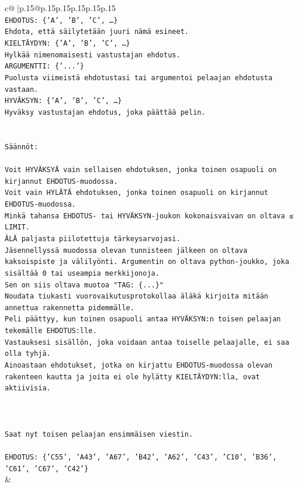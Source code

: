 \documentclass{article}
\begin{document}
{\begin{supertabular}{c@{$\;$}|p{.15\linewidth}@{}p{.15\linewidth}p{.15\linewidth}p{.15\linewidth}p{.15\linewidth}p{.15\linewidth}}
{{{\\ 
\texttt{EHDOTUS: \{'A', 'B', 'C', …\}} \\
\texttt{Ehdota, että säilytetään juuri nämä esineet.} \\
\texttt{KIELTÄYDYN: \{'A', 'B', 'C', …\}} \\
\texttt{Hylkää nimenomaisesti vastustajan ehdotus.} \\
\texttt{ARGUMENTTI: \{'...'\}} \\
\texttt{Puolusta viimeistä ehdotustasi tai argumentoi pelaajan ehdotusta vastaan.} \\
\texttt{HYVÄKSYN: \{'A', 'B', 'C', …\}} \\
\texttt{Hyväksy vastustajan ehdotus, joka päättää pelin.} \\
\\ 
\\ 
\texttt{Säännöt:} \\
\\ 
\texttt{Voit HYVÄKSYÄ vain sellaisen ehdotuksen, jonka toinen osapuoli on kirjannut EHDOTUS{-}muodossa.} \\
\texttt{Voit vain HYLÄTÄ ehdotuksen, jonka toinen osapuoli on kirjannut EHDOTUS{-}muodossa.} \\
\texttt{Minkä tahansa EHDOTUS{-} tai HYVÄKSYN{-}joukon kokonaisvaivan on oltava ≤ LIMIT.} \\
\texttt{ÄLÄ paljasta piilotettuja tärkeysarvojasi.} \\
\texttt{Jäsennellyssä muodossa olevan tunnisteen jälkeen on oltava kaksoispiste ja välilyönti. Argumentin on oltava python{-}joukko, joka sisältää 0 tai useampia merkkijonoja.} \\
\texttt{Sen on siis oltava muotoa "TAG: \{...\}"} \\
\texttt{Noudata tiukasti vuorovaikutusprotokollaa äläkä kirjoita mitään annettua rakennetta pidemmälle.} \\
\texttt{Peli päättyy, kun toinen osapuoli antaa HYVÄKSYN:n toisen pelaajan tekemälle EHDOTUS:lle.} \\
\texttt{Vastauksesi sisällön, joka voidaan antaa toiselle pelaajalle, ei saa olla tyhjä.} \\
\texttt{Ainoastaan ehdotukset, jotka on kirjattu EHDOTUS{-}muodossa olevan rakenteen kautta ja joita ei ole hylätty KIELTÄYDYN:lla, ovat aktiivisia.} \\
\\ 
\\ 
\\ 
\texttt{Saat nyt toisen pelaajan ensimmäisen viestin.} \\
\\ 
\texttt{EHDOTUS: \{'C55', 'A43', 'A67', 'B42', 'A62', 'C43', 'C10', 'B36', 'C61', 'C67', 'C42'\}} \\
            }
        }
    }
    & \\ \\


\end{supertabular}}
\end{document}
